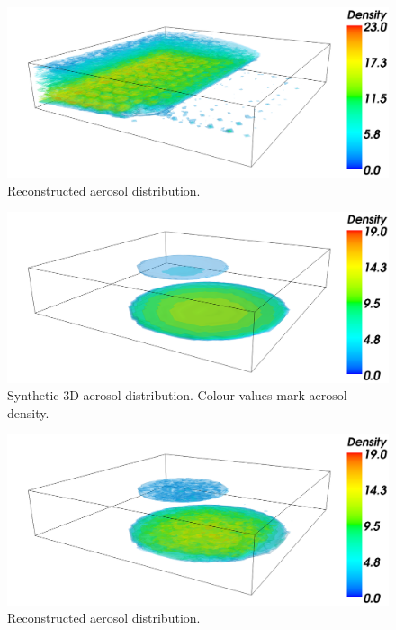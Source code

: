 \documentclass[10pt,twocolumn,letterpaper]{article}
\begin{document}
\begin{figure}
  \centering
    \includegraphics[width=\columnwidth]{images/recon2}
  \caption{Reconstructed aerosol distribution.}
  \label{fig:synth-result}
\end{figure}

\begin{figure}
  \centering
    \includegraphics[width=\columnwidth]{images/orig1}
  \caption{Synthetic 3D aerosol distribution. Colour values mark
    aerosol density.}
  \label{fig:synth-atmo2}
\end{figure}

\begin{figure}
  \centering
    \includegraphics[width=\columnwidth]{images/recon1}
  \caption{Reconstructed aerosol distribution.}
  \label{fig:synth-result2}
\end{figure}
\end{document}
